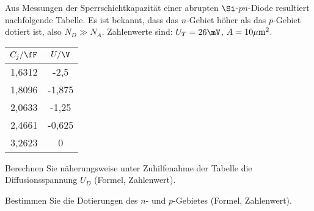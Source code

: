 \documentclass{article}
\begin{document}
\begin{exercise}
Aus Messungen der Sperrschichtkapazität einer abrupten $\Si$-$pn$-Diode resultiert nachfolgende Tabelle. Es ist bekannt, dass das $n$-Gebiet höher als das $p$-Gebiet dotiert ist, also $N_D\gg N_A$. Zahlenwerte sind: $U_T=26\mV$, $A=10\mathrm{\mu m}^2$.
\begin{table}[h]
    \centering
    \begin{tabular}{cc}
        $C_j/\fF$ & $U/\V$ \\
        \midrule
        1,6312    & -2,5   \\
        1,8096    & -1,875 \\
        2,0633    & -1,25  \\
        2,4661    & -0,625 \\
        3,2623    & 0
    \end{tabular}
\end{table}
\begin{tasks}
        \item Berechnen Sie näherungsweise unter Zuhilfenahme der Tabelle die Diffusionsspannung $U_D$ (Formel, Zahlenwert).
        \item Bestimmen Sie die Dotierungen des $n$- und $p$-Gebietes (Formel, Zahlenwert).
\end{tasks}
\end{exercise}

\begin{solution}

\end{solution}
\end{document}
